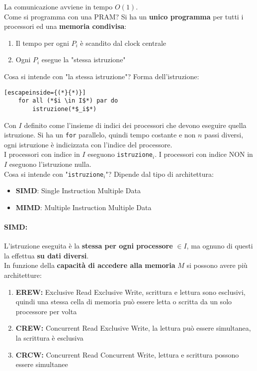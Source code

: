 La comunicazione avviene in tempo $O(1)$.\\

Come si programma con una PRAM?  Si ha un \textbf{unico programma} per tutti i processori ed una \textbf{memoria condivisa}: 
\begin{enumerate}
	\item Il tempo per ogni $P_i$ è scandito dal clock centrale
	\item Ogni $P_i$ esegue la "stessa istruzione"
\end{enumerate}

Cosa si intende con "la stessa istruzione"? Forma dell'istruzione:
\begin{lstlisting}[escapeinside={(*}{*)}]
	for all (*$i \in I$*) par do
		istruzione(*$_i$*)
\end{lstlisting}


Con $I$ definito come l'insieme di indici dei processori che devono eseguire quella istruzione. Si ha un \texttt{for} parallelo, quindi tempo costante  e non $n$ passi diversi, ogni istruzione è indicizzata con l'indice del processore.\\

I processori con indice in $I$ eseguono \texttt{istruzione}$_i$. I processori con indice NON in $I$ eseguono l'istruzione nulla.\\

Cosa si intende con "\texttt{istruzione}$_i$"? Dipende dal tipo di architettura: 
\begin{itemize}
	\item \textbf{SIMD}: Single Instruction Multiple Data
	\item \textbf{MIMD}: Multiple Instruction Multiple Data
\end{itemize}

\paragraph{SIMD:} L'istruzione eseguita è la \textbf{stessa per ogni processore} $\in I$, ma ognuno di questi la effettua \textbf{su dati diversi}.\\

In funzione della \textbf{capacità di accedere alla memoria} $M$ si possono avere più architetture: 
\begin{enumerate}
	\item \textbf{EREW:} Exclusive Read Exclusive Write, scrittura e lettura sono esclusivi, quindi una stessa cella di memoria può essere letta o scritta da un solo processore per volta
	\item \textbf{CREW:} Concurrent Read Exclusive Write, la lettura può essere simultanea, la scrittura è esclusiva
	\item \textbf{CRCW:} Concurrent Read Concurrent Write, lettura e scrittura possono essere simultanee
\end{enumerate}

